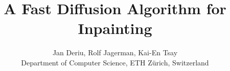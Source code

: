 \documentclass[10pt,conference,compsocconf]{IEEEtran}
\begin{document}
\title{A Fast Diffusion Algorithm for Inpainting}

\author{
  Jan Deriu, Rolf Jagerman, Kai-En Tsay\\
  Department of Computer Science, ETH Zürich, Switzerland
}

\maketitle


















\end{document}
